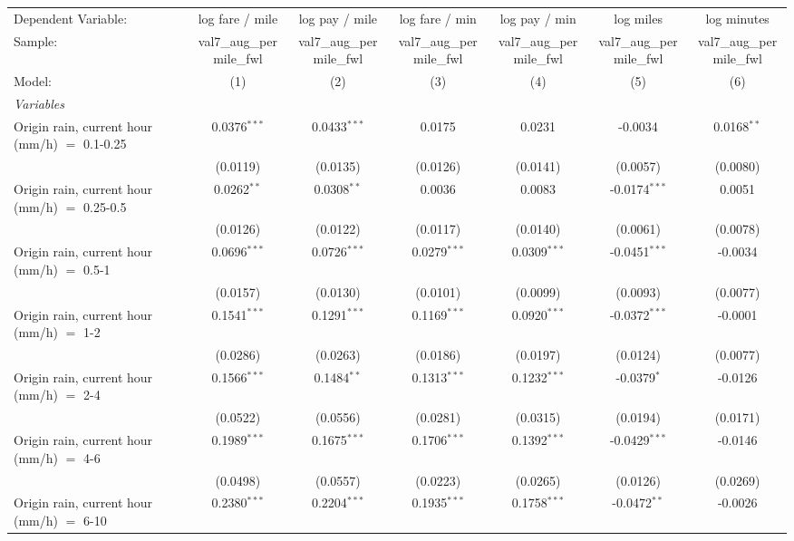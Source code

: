 \ifdefined\ifclassloaded
{}
\fi
\begingroup
\centering
\begin{tabular}{lcccccc}
   \tabularnewline \midrule \midrule
   Dependent Variable: & log fare / mile & log pay / mile & log fare / min & log pay / min & log miles & log minutes\\
   Sample: & val7\_aug\_permile\_fwl & val7\_aug\_permile\_fwl & val7\_aug\_permile\_fwl & val7\_aug\_permile\_fwl & val7\_aug\_permile\_fwl & val7\_aug\_permile\_fwl \\
   Model: & (1) & (2) & (3) & (4) & (5) & (6)\\
   \midrule
   \emph{Variables}\\
   Origin rain, current hour (mm/h) $=$ 0.1-0.25 & 0.0376$^{***}$ & 0.0433$^{***}$ & 0.0175 & 0.0231 & -0.0034 & 0.0168$^{**}$\\
    & (0.0119) & (0.0135) & (0.0126) & (0.0141) & (0.0057) & (0.0080)\\
   Origin rain, current hour (mm/h) $=$ 0.25-0.5 & 0.0262$^{**}$ & 0.0308$^{**}$ & 0.0036 & 0.0083 & -0.0174$^{***}$ & 0.0051\\
    & (0.0126) & (0.0122) & (0.0117) & (0.0140) & (0.0061) & (0.0078)\\
   Origin rain, current hour (mm/h) $=$ 0.5-1 & 0.0696$^{***}$ & 0.0726$^{***}$ & 0.0279$^{***}$ & 0.0309$^{***}$ & -0.0451$^{***}$ & -0.0034\\
    & (0.0157) & (0.0130) & (0.0101) & (0.0099) & (0.0093) & (0.0077)\\
   Origin rain, current hour (mm/h) $=$ 1-2 & 0.1541$^{***}$ & 0.1291$^{***}$ & 0.1169$^{***}$ & 0.0920$^{***}$ & -0.0372$^{***}$ & -0.0001\\
    & (0.0286) & (0.0263) & (0.0186) & (0.0197) & (0.0124) & (0.0077)\\
   Origin rain, current hour (mm/h) $=$ 2-4 & 0.1566$^{***}$ & 0.1484$^{**}$ & 0.1313$^{***}$ & 0.1232$^{***}$ & -0.0379$^{*}$ & -0.0126\\
    & (0.0522) & (0.0556) & (0.0281) & (0.0315) & (0.0194) & (0.0171)\\
   Origin rain, current hour (mm/h) $=$ 4-6 & 0.1989$^{***}$ & 0.1675$^{***}$ & 0.1706$^{***}$ & 0.1392$^{***}$ & -0.0429$^{***}$ & -0.0146\\
    & (0.0498) & (0.0557) & (0.0223) & (0.0265) & (0.0126) & (0.0269)\\
   Origin rain, current hour (mm/h) $=$ 6-10 & 0.2380$^{***}$ & 0.2204$^{***}$ & 0.1935$^{***}$ & 0.1758$^{***}$ & -0.0472$^{**}$ & -0.0026\\

\end{tabular}

